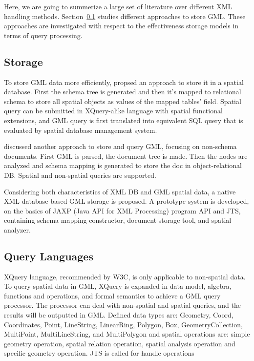 Here, we are going to summerize a large set of literature
over different XML handling methods. Section~\ref{storage} studies
different approaches to store GML. These approaches are investigated
with respect to the effectiveness storage models in terms of query processing.
  
\subsection{Storage}
\label{storage}
To store GML data more efficiently, \cite{Li2004} propsed an approach 
to store it in a spatial database. First the schema tree is generated
 and then it's mapped to relational schema to store all spatial objects as 
values of the mapped tables' field.  Spatial query can be submitted 
in XQuery-alike language with spatial functional extensions, and GML 
query is first translated into equivalent SQL query that is evaluated 
by spatial database management system.

\cite{Zhu2011} discussed another approach to store and query GML, 
focusing on non-schema documents.
First GML is parsed, the document tree is made. Then the nodes are analyzed and 
schema mapping is generated to store the doc in object-relational DB. 
Spatial and non-spatial queries are supported.

\cite{Zhang2008} Considering both characteristics of XML DB and GML spatial data, 
a native XML database based GML storage is proposed. A prototype system 
is developed, on the basics of JAXP (Java API for XML Processing) program API 
and JTS, containing schema mapping constructor, document storage tool, 
and spatial analyzer.

\subsection{Query Languages}
\label{index}
\cite{Fubao2010} XQuery language, recommended by W3C, is only 
applicable to non-spatial data. To query spatial data in GML, 
XQuery is expanded in data model, algebra, functions and operations, 
and formal semantics to achieve a GML query processor. The processor can 
deal with non-spatial and spatial queries, and the results will be outputted in GML.
Defined data types are: Geometry, Coord, Coordinates, Point, LineString, LinearRing, 
Polygon, Box, GeometryCollection, MultiPoint, MultiLineString, and MultiPolygon 
and spatial operations are: simple geometry operation, spatial relation 
operation, spatial analysis operation and specific geometry operation. 
JTS is called for handle operations


